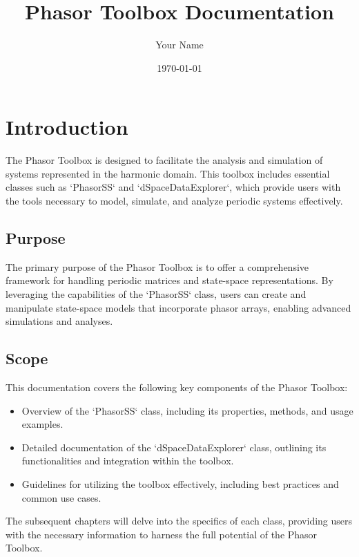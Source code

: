 \documentclass{article}
\title{Phasor Toolbox Documentation}
\author{Your Name}
\date{\today}
\begin{document}
\maketitle

\section{Introduction}

The Phasor Toolbox is designed to facilitate the analysis and simulation of systems represented in the harmonic domain. This toolbox includes essential classes such as `PhasorSS` and `dSpaceDataExplorer`, which provide users with the tools necessary to model, simulate, and analyze periodic systems effectively.

\subsection{Purpose}

The primary purpose of the Phasor Toolbox is to offer a comprehensive framework for handling periodic matrices and state-space representations. By leveraging the capabilities of the `PhasorSS` class, users can create and manipulate state-space models that incorporate phasor arrays, enabling advanced simulations and analyses.

\subsection{Scope}

This documentation covers the following key components of the Phasor Toolbox:

\begin{itemize}
    \item Overview of the `PhasorSS` class, including its properties, methods, and usage examples.
    \item Detailed documentation of the `dSpaceDataExplorer` class, outlining its functionalities and integration within the toolbox.
    \item Guidelines for utilizing the toolbox effectively, including best practices and common use cases.
\end{itemize}

The subsequent chapters will delve into the specifics of each class, providing users with the necessary information to harness the full potential of the Phasor Toolbox.
\end{document}
